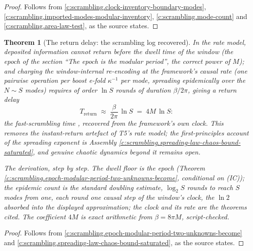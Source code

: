 \documentclass[11pt]{article}
\newtheorem{theorem}{Theorem}[section]
\theoremstyle{definition}
\theoremstyle{plain}
\begin{document}
\begin{proof}
Follows from \ref{c:scrambling.clock-inventory-boundary-modes}, \ref{c:scrambling.imported-modes-modular-inventory}, \ref{c:scrambling.mode-count} and \ref{c:scrambling.area-law-test}, as the source states.

\end{proof}

\begin{theorem}[The return delay: the scrambling log recovered]\label{c:scrambling.return-delay-scrambling-log-recovered}
In the rate model, deposited information cannot return before the dwell time of the window (the epoch of the section ``The epoch is the modular period'', the correct power of $M$); and charging the window-internal re-encoding at the framework's causal rate (one pairwise operation per boost e-fold $\kappa^{-1}$ per mode, spreading epidemically over the $N \sim S$ modes) requires of order $\ln S$ rounds of duration $\beta/2\pi$, giving a return delay
\[
T_{\mathrm{return}} \;\approx\; \frac{\beta}{2\pi}\,\ln S \;=\; 4M\,\ln S :
\]
the fast-scrambling time \cite{HaydenPreskill2007, SekinoSusskind2008}, recovered from the framework's own clock. This removes the instant-return artefact of T5's rate model; the first-principles account of the spreading exponent is Assembly \ref{c:scrambling.spreading-law-chaos-bound-saturated}, and genuine chaotic dynamics beyond it remains open.

\smallskip
\noindent\emph{The derivation, step by step.} The dwell floor is the epoch (Theorem \ref{c:scrambling.epoch-modular-period-two-unknowns-become}, conditional on (IC)); the epidemic count is the standard doubling estimate, $\log_2 S$ rounds to reach $S$ modes from one, each round one causal step of the window's clock, the $\ln 2$ absorbed into the displayed approximation; the clock and its rate are the theorems cited. The coefficient $4M$ is exact arithmetic from $\beta = 8\pi M$, script-checked.
\end{theorem}
\begin{proof}
Follows from \ref{c:scrambling.epoch-modular-period-two-unknowns-become} and \ref{c:scrambling.spreading-law-chaos-bound-saturated}, as the source states.

\end{proof}
\end{document}
